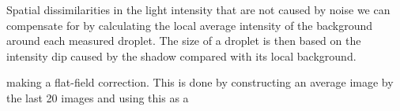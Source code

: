 Spatial dissimilarities in the light intensity that are not caused by noise we can compensate for by calculating the local average intensity of the background around each measured droplet. The size of a droplet is then based on the intensity dip caused by the shadow compared with its local background.


making a flat-field correction. This is done by constructing an average image by the last 20 images and using this as a 




